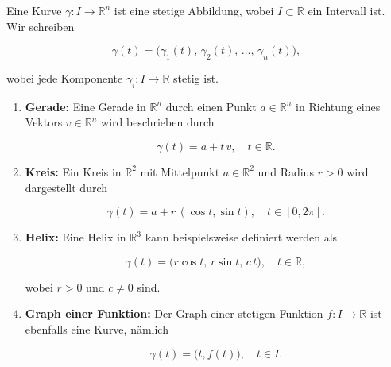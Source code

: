 \begin{definition}{}{}
Eine Kurve $\gamma : I \to \mathbb{R}^n$ ist eine stetige Abbildung, wobei $I \subset \mathbb{R}$ ein Intervall ist.\\
Wir schreiben


\[
\gamma(t) = \bigl( \gamma_1(t),\, \gamma_2(t),\, \dots,\, \gamma_n(t) \bigr),
\]


wobei jede Komponente $\gamma_i : I \to \mathbb{R}$ stetig ist.
\end{definition}

\begin{beispielbox}
\begin{enumerate}
  \item \textbf{Gerade:} Eine Gerade in $\mathbb{R}^n$ durch einen Punkt $a \in \mathbb{R}^n$ in Richtung eines Vektors $v \in \mathbb{R}^n$ wird beschrieben durch
  

\[
  \gamma(t) = a + t\,v, \quad t \in \mathbb{R}.
  \]


  
  \item \textbf{Kreis:} Ein Kreis in $\mathbb{R}^2$ mit Mittelpunkt $a \in \mathbb{R}^2$ und Radius $r > 0$ wird dargestellt durch
  

\[
  \gamma(t) = a + r\,(\cos t, \sin t), \quad t \in [0, 2\pi].
  \]


  
  \item \textbf{Helix:} Eine Helix in $\mathbb{R}^3$ kann beispielsweise definiert werden als
  

\[
  \gamma(t) = \bigl( r\cos t,\, r\sin t,\, c\,t \bigr), \quad t \in \mathbb{R},
  \]


  wobei $r > 0$ und $c \neq 0$ sind.
  
  \item \textbf{Graph einer Funktion:} Der Graph einer stetigen Funktion $f : I \to \mathbb{R}$ ist ebenfalls eine Kurve, nämlich
  

\[
  \gamma(t) = \bigl( t, f(t) \bigr), \quad t \in I.
  \]


\end{enumerate}
\end{beispielbox}